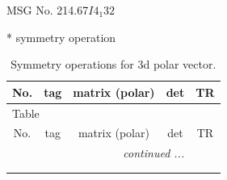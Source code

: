 \documentclass[fleqn,8pt]{jsarticle}
\begin{document}
\setcounter{MaxMatrixCols}{32}

\renewcommand{\tablename}{Table~}
\renewcommand{\figurename}{Figure~}
\begin{center}
\LARGE
MSG No. 214.67\quad$I4_{1}32$
\end{center}
* symmetry operation
\renewcommand{\arraystretch}{1.3}
\begin{longtable}{ccccc}
\caption{Symmetry operations for 3d polar vector.}
 \\
 \hline \hline
No. & tag & matrix (polar) & det & TR \\ \hline \endfirsthead

\multicolumn{4}{l}{\tablename\ \thetable{}} \\
 \hline \hline
No. & tag & matrix (polar) & det & TR \\ \hline \endhead

 \hline \hline
\multicolumn{4}{r}{\footnotesize\it continued ...} \\ \endfoot

 \hline \hline
\multicolumn{4}{r}{} \\ \endlastfoot


\end{longtable}
\end{document}
